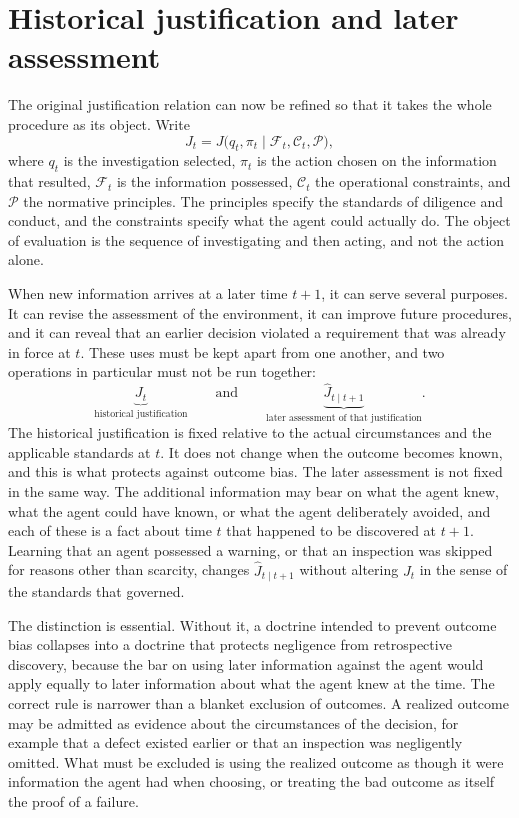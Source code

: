 \documentclass[11pt]{article}
\newcommand{\F}{\mathcal F}
\newcommand{\C}{\mathcal C}
\theoremstyle{definition}
\begin{document}
\section{Historical justification and later assessment}

The original justification relation can now be refined so that it takes the whole procedure as its object. Write
\[
J_t = J\bigl(q_t,\pi_t \mid \F_t,\C_t,\mathcal P\bigr),
\]
where $q_t$ is the investigation selected, $\pi_t$ is the action chosen on the information that resulted, $\F_t$ is the information possessed, $\C_t$ the operational constraints, and $\mathcal P$ the normative principles. The principles specify the standards of diligence and conduct, and the constraints specify what the agent could actually do. The object of evaluation is the sequence of investigating and then acting, and not the action alone.

When new information arrives at a later time $t+1$, it can serve several purposes. It can revise the assessment of the environment, it can improve future procedures, and it can reveal that an earlier decision violated a requirement that was already in force at $t$. These uses must be kept apart from one another, and two operations in particular must not be run together:
\[
\underbrace{J_t}_{\text{historical justification}}
\qquad\text{and}\qquad
\underbrace{\widehat J_{t\mid t+1}}_{\text{later assessment of that justification}}.
\]
The historical justification is fixed relative to the actual circumstances and the applicable standards at $t$. It does not change when the outcome becomes known, and this is what protects against outcome bias. The later assessment is not fixed in the same way. The additional information may bear on what the agent knew, what the agent could have known, or what the agent deliberately avoided, and each of these is a fact about time $t$ that happened to be discovered at $t+1$. Learning that an agent possessed a warning, or that an inspection was skipped for reasons other than scarcity, changes $\widehat J_{t\mid t+1}$ without altering $J_t$ in the sense of the standards that governed.

The distinction is essential. Without it, a doctrine intended to prevent outcome bias collapses into a doctrine that protects negligence from retrospective discovery, because the bar on using later information against the agent would apply equally to later information about what the agent knew at the time. The correct rule is narrower than a blanket exclusion of outcomes. A realized outcome may be admitted as evidence about the circumstances of the decision, for example that a defect existed earlier or that an inspection was negligently omitted. What must be excluded is using the realized outcome as though it were information the agent had when choosing, or treating the bad outcome as itself the proof of a failure.
\end{document}

